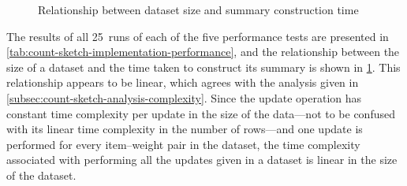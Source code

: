 \begin{figure}
  \centering
  \caption{Relationship between dataset size and summary construction time}
  \label{fig:count-sketch-implementation-performance}
\end{figure}

The results of all \num{25}~runs of each of the five performance tests are presented in \cref{tab:count-sketch-implementation-performance}, and the relationship between the size of a dataset and the time taken to construct its summary is shown in \cref{fig:count-sketch-implementation-performance}.
This relationship appears to be linear, which agrees with the analysis given in \cref{subsec:count-sketch-analysis-complexity}.
Since the update operation has constant time complexity per update in the size of the data---not to be confused with its linear time complexity in the number of rows---and one update is performed for every item--weight pair in the dataset, the time complexity associated with performing all the updates given in a dataset is linear in the size of the dataset.

